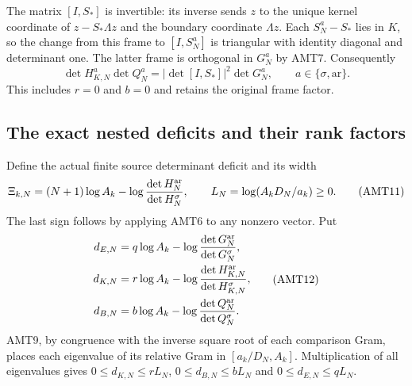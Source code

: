 \documentclass[11pt,a4paper]{article}
\begin{document}
The matrix $[I,S_*]$ is invertible: its inverse sends $z$ to the
unique kernel coordinate of $z-S_*\Lambda z$ and the boundary
coordinate $\Lambda z$. Each $S_N^a-S_*$ lies in $K$, so the
change from this frame to $[I,S_N^a]$ is triangular with identity
diagonal and determinant one. The latter frame is orthogonal in
$G_N^a$ by AMT7. Consequently
\[
 \boxed{\quad\det H_{K,N}^a\det Q_N^a
       =|\det[I,S_*]|^2\det G_N^a,\qquad a\in\{\sigma,\mathrm{ar}\}.\quad}
 \tag{AMT10}
\]
This includes $r=0$ and $b=0$ and retains the original frame factor.

\subsection{The exact nested deficits and their rank factors}
Define the actual finite source determinant deficit and its width
\[
 \Xi_{k,N}=(N+1)\log A_k-
                  \log\frac{\det H_N^{\rm ar}}{\det H_N^\sigma},
 \qquad L_N=\log(A_kD_N/a_k)\ge0.
 \tag{AMT11}
\]
The last sign follows by applying AMT6 to any nonzero vector.
Put
\[
\begin{split}
 d_{E,N}&=q\log A_k-\log\frac{\det G_N^{\rm ar}}{\det G_N^\sigma},\\
 d_{K,N}&=r\log A_k-\log\frac{\det H_{K,N}^{\rm ar}}{\det H_{K,N}^\sigma},\\
 d_{B,N}&=b\log A_k-\log\frac{\det Q_N^{\rm ar}}{\det Q_N^\sigma}.
\end{split}\tag{AMT12}
\]
AMT9, by congruence with the inverse square root of each comparison
Gram, places each eigenvalue of its relative Gram in
$[a_k/D_N,A_k]$. Multiplication of all eigenvalues gives
$0\le d_{K,N}\le rL_N$, $0\le d_{B,N}\le bL_N$ and
$0\le d_{E,N}\le qL_N$.
\end{document}
